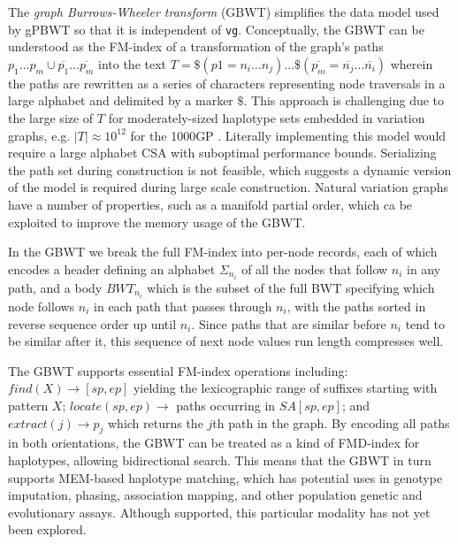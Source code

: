 The \emph{graph Burrows-Wheeler transform} (GBWT) \cite{siren2018haplotype} simplifies the data model used by gPBWT so that it is independent of {\tt vg}.
Conceptually, the GBWT can be understood as the FM-index of a transformation of the graph's paths $p_1\ldots p_m \cup \overline{p_1}\ldots \overline{p_m}$ into the text $T = \$( p1 = n_i\ldots n_j) \ldots \$ (\overline{p_m} = \overline{n_j} \ldots \overline{n_i}) $ wherein the paths are rewritten as a series of characters representing node traversals in a large alphabet and delimited by a marker $\$$.
This approach is challenging due to the large size of $T$ for moderately-sized haplotype sets embedded in variation graphs, e.g. $|T| \approx 10^{12}$ for the 1000GP \cite{siren2018haplotype}.
Literally implementing this model would require a large alphabet CSA with suboptimal performance bounds.
Serializing the path set during construction is not feasible, which suggests a dynamic version of the model is required during large scale construction.
Natural variation graphs have a number of properties, such as a manifold partial order, which ca be exploited to improve the memory usage of the GBWT.

In the GBWT we break the full FM-index into per-node records, each of which encodes a header defining an alphabet $\Sigma_{n_i}$ of all the nodes that follow $n_i$ in any path, and a body $BWT_{n_i}$ which is the subset of the full BWT specifying which node follows $n_i$ in each path that passes through $n_i$, with the paths sorted in reverse sequence order up until $n_i$.
Since paths that are similar before $n_i$ tend to be similar after it, this sequence of next node values run length compresses well.

The GBWT supports essential FM-index operations including: $find(X) \to [sp, ep]$ yielding the lexicographic range of suffixes starting with pattern $X$; $locate(sp, ep) \to$ paths occurring in $SA[sp, ep]$; and $extract(j) \to p_j$ which returns the $j$th path in the graph.
By encoding all paths in both orientations, the GBWT can be treated as a kind of FMD-index for haplotypes, allowing bidirectional search.
This means that the GBWT in turn supports MEM-based haplotype matching, which has potential uses in genotype imputation, phasing, association mapping, and other population genetic and evolutionary assays.
Although supported, this particular modality has not yet been explored.

